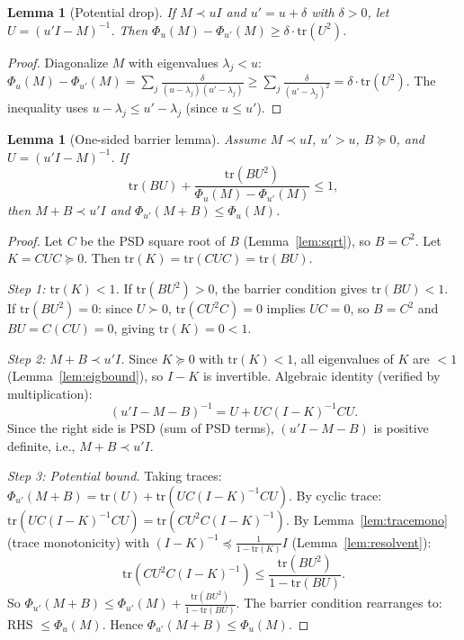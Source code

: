 \documentclass{article}
\newtheorem{lemma}[theorem]{Lemma}
\theoremstyle{definition}
\begin{document}
\begin{lemma}[Potential drop]\label{lem:drop}
If $M \prec uI$ and $u' = u + \delta$ with $\delta > 0$, let $U = (u'I - M)^{-1}$. Then
$\Phi_u(M) - \Phi_{u'}(M) \ge \delta \cdot \mathrm{tr}(U^2)$.
\end{lemma}
\begin{proof}
Diagonalize $M$ with eigenvalues $\lambda_j < u$:
$\Phi_u(M) - \Phi_{u'}(M) = \sum_j \frac{\delta}{(u - \lambda_j)(u' - \lambda_j)}
\ge \sum_j \frac{\delta}{(u' - \lambda_j)^2} = \delta \cdot \mathrm{tr}(U^2)$.
The inequality uses $u - \lambda_j \le u' - \lambda_j$ (since $u \le u'$).
\end{proof}

\begin{lemma}[One-sided barrier lemma]\label{lem:barrier}
Assume $M \prec uI$, $u' > u$, $B \succeq 0$, and $U = (u'I - M)^{-1}$.
If
\[
  \mathrm{tr}(BU) + \frac{\mathrm{tr}(BU^2)}{\Phi_u(M) - \Phi_{u'}(M)} \le 1,
\]
then $M + B \prec u'I$ and $\Phi_{u'}(M+B) \le \Phi_u(M)$.
\end{lemma}
\begin{proof}
Let $C$ be the PSD square root of $B$ (Lemma~\ref{lem:sqrt}), so $B = C^2$.
Let $K = CUC \succeq 0$. Then $\mathrm{tr}(K) = \mathrm{tr}(CUC) = \mathrm{tr}(BU)$.

\emph{Step 1: $\mathrm{tr}(K) < 1$.}
If $\mathrm{tr}(BU^2) > 0$, the barrier condition gives $\mathrm{tr}(BU) < 1$.
If $\mathrm{tr}(BU^2) = 0$: since $U \succ 0$, $\mathrm{tr}(CU^2 C) = 0$ implies $UC = 0$,
so $B = C^2$ and $BU = C(CU) = 0$, giving $\mathrm{tr}(K) = 0 < 1$.

\emph{Step 2: $M + B \prec u'I$.}
Since $K \succeq 0$ with $\mathrm{tr}(K) < 1$, all eigenvalues of $K$ are $< 1$
(Lemma~\ref{lem:eigbound}), so $I - K$ is invertible.
Algebraic identity (verified by multiplication):
\[
  (u'I - M - B)^{-1} = U + UC(I - K)^{-1}CU.
\]
Since the right side is PSD (sum of PSD terms), $(u'I - M - B)$ is positive definite,
i.e., $M + B \prec u'I$.

\emph{Step 3: Potential bound.}
Taking traces: $\Phi_{u'}(M+B) = \mathrm{tr}(U) + \mathrm{tr}(UC(I-K)^{-1}CU)$.
By cyclic trace: $\mathrm{tr}(UC(I-K)^{-1}CU) = \mathrm{tr}(CU^2 C(I-K)^{-1})$.
By Lemma~\ref{lem:tracemono} (trace monotonicity) with
$(I-K)^{-1} \preceq \frac{1}{1-\mathrm{tr}(K)} I$ (Lemma~\ref{lem:resolvent}):
\[
  \mathrm{tr}(CU^2 C (I-K)^{-1}) \le \frac{\mathrm{tr}(BU^2)}{1 - \mathrm{tr}(BU)}.
\]
So $\Phi_{u'}(M+B) \le \Phi_{u'}(M) + \frac{\mathrm{tr}(BU^2)}{1 - \mathrm{tr}(BU)}$.
The barrier condition rearranges to: RHS $\le \Phi_u(M)$. Hence $\Phi_{u'}(M+B) \le \Phi_u(M)$.
\end{proof}
\end{document}
